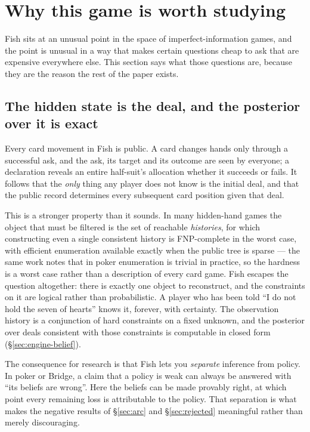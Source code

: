 \section{Why this game is worth studying}
\label{sec:domain}

Fish sits at an unusual point in the space of imperfect-information games, and the point is
unusual in a way that makes certain questions cheap to ask that are expensive everywhere else. This
section says what those questions are, because they are the reason the rest of the paper exists.

\subsection{The hidden state is the deal, and the posterior over it is exact}
\label{sec:domain-exact}

Every card movement in Fish is public. A card changes hands only through a successful ask, and the
ask, its target and its outcome are seen by everyone; a declaration reveals an entire half-suit's
allocation whether it succeeds or fails. It follows that the \emph{only} thing any player does not
know is the initial deal, and that the public record determines every subsequent card position given
that deal.

This is a stronger property than it sounds. In many hidden-hand games the object that must be filtered is the set of reachable
\emph{histories}, for which constructing even a single consistent history is FNP-complete in the
worst case, with efficient enumeration available exactly when the public tree is sparse
\cite{solinas-history} --- the same work notes that in poker enumeration is trivial in practice, so
the hardness is a worst case rather than a description of every card game. Fish escapes the question
altogether: there is exactly one object to reconstruct, and the
constraints on it are logical rather than probabilistic. A player who has been told ``I do not hold
the seven of hearts'' knows it, forever, with certainty. The observation history is a conjunction of
hard constraints on a fixed unknown, and the posterior over deals consistent with those constraints
is computable in closed form (\S\ref{sec:engine-belief}).

The consequence for research is that Fish lets you \emph{separate} inference from policy. In poker
or Bridge, a claim that a policy is weak can always be answered with ``its beliefs are wrong''. Here
the beliefs can be made provably right, at which point every remaining loss is attributable to the
policy. That separation is what makes the negative results of \S\ref{sec:arc} and
\S\ref{sec:rejected} meaningful rather than merely discouraging.

